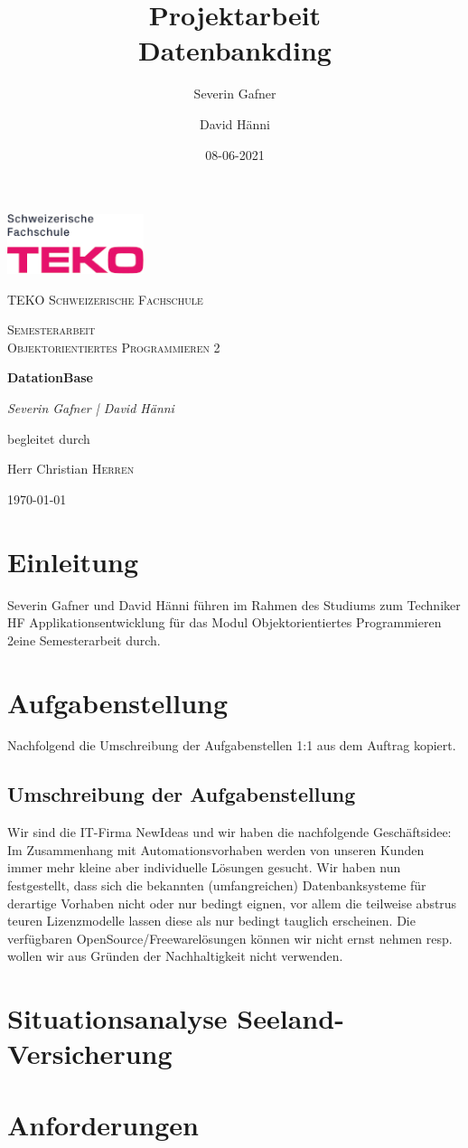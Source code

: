 \documentclass{article}
\title{Projektarbeit \\ Datenbankding}
\date{08-06-2021}
\author{Severin Gafner \and David Hänni}
\def\Cmodule{Objektorientiertes Programmieren 2}
\def\Ctitle{DatationBase}
\def\Cschool{TEKO Schweizerische Fachschule}
\begin{document}
\begin{titlepage}
	\centering
	\includegraphics[width=0.3\textwidth]{images/teko-logo-pink.jpg}\par\vspace{1cm}
	{\scshape\LARGE \Cschool\par}
	\vspace{1cm}
	{\scshape\Large Semesterarbeit \\ \Cmodule\par}
	\vspace{1.5cm}
	{\huge\bfseries \Ctitle\par}
	\vspace{2cm}
	{\Large\itshape Severin Gafner | David Hänni\par}
	\vfill
	begleitet durch\par
	Herr Christian \textsc{Herren}

	\vfill

	{\large \germanformat\today\par}
\end{titlepage}
\newpage
{}

\section{Einleitung}

Severin Gafner und David Hänni führen im Rahmen des Studiums zum Techniker HF Applikationsentwicklung für das Modul \Cmodule eine Semesterarbeit durch. 

\section{Aufgabenstellung}
Nachfolgend die Umschreibung der Aufgabenstellen 1:1 aus dem Auftrag kopiert.
\subsection{Umschreibung der Aufgabenstellung}
Wir sind die IT-Firma NewIdeas und wir haben die nachfolgende Geschäftsidee: 
Im Zusammenhang mit Automationsvorhaben werden von unseren Kunden immer mehr kleine aber individuelle Lösungen gesucht. 
Wir haben nun festgestellt, dass sich die bekannten (umfangreichen) Datenbanksysteme für derartige Vorhaben nicht oder nur bedingt eignen, vor allem die teilweise abstrus teuren Lizenzmodelle lassen diese als nur bedingt tauglich erscheinen. 
Die verfügbaren OpenSource/Freewarelösungen können wir nicht ernst nehmen resp. wollen wir aus Gründen der Nachhaltigkeit nicht verwenden. 
\section{Situationsanalyse Seeland-Versicherung}

\section{Anforderungen}
\end{document}
